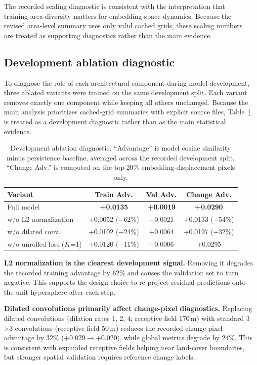 \documentclass{article}
\begin{document}
The recorded scaling diagnostic is consistent with the interpretation that training-area diversity matters for embedding-space dynamics. Because the revised area-level summary uses only valid cached grids, these scaling numbers are treated as supporting diagnostics rather than the main evidence.

\subsection{Development ablation diagnostic}
\label{sec:ablation}

To diagnose the role of each architectural component during model development, three ablated variants were trained on the same development split. Each variant removes exactly one component while keeping all others unchanged. Because the main analysis prioritizes cached-grid summaries with explicit source files, Table~\ref{tab:ablation} is treated as a development diagnostic rather than as the main statistical evidence.

\begin{table}[htbp]
\centering
\caption{Development ablation diagnostic. ``Advantage'' is model cosine similarity minus persistence baseline, averaged across the recorded development split. ``Change Adv.'' is computed on the top-20\% embedding-displacement pixels only.}
\label{tab:ablation}
\begin{tabular}{lccc}
\toprule
Variant & Train Adv. & Val Adv. & Change Adv. \\
\midrule
Full model & \textbf{+0.0135} & \textbf{+0.0019} & \textbf{+0.0290} \\
w/o L2 normalization & +0.0052 ($-$62\%) & $-$0.0021 & +0.0133 ($-$54\%) \\
w/o dilated conv. & +0.0102 ($-$24\%) & +0.0064 & +0.0197 ($-$32\%) \\
w/o unrolled loss ($K$=1) & +0.0120 ($-$11\%) & $-$0.0006 & +0.0295 \\
\bottomrule
\end{tabular}
\end{table}

\textbf{L2 normalization is the clearest development signal.} Removing it degrades the recorded training advantage by 62\% and causes the validation set to turn negative. This supports the design choice to re-project residual predictions onto the unit hypersphere after each step.

\textbf{Dilated convolutions primarily affect change-pixel diagnostics.} Replacing dilated convolutions (dilation rates 1, 2, 4; receptive field 170\,m) with standard 3$\times$3 convolutions (receptive field 50\,m) reduces the recorded change-pixel advantage by 32\% ($+0.029 \to +0.020$), while global metrics degrade by 24\%. This is consistent with expanded receptive fields helping near land-cover boundaries, but stronger spatial validation requires reference change labels.
\end{document}
